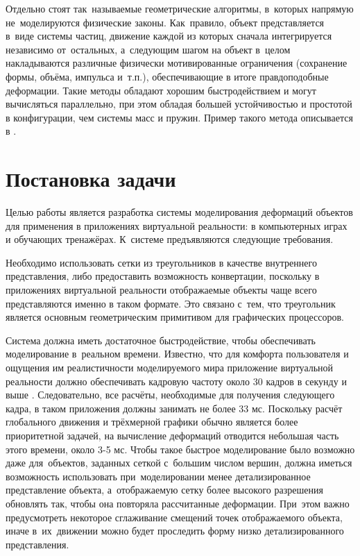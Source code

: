 \documentclass[a4paper, 14pt, titlepage]{extarticle}
\let\oldsection\section
\renewcommand{\section}{\newpage\oldsection}
\begin{document}
    Отдельно стоят так~называемые геометрические алгоритмы, в~которых напрямую не~моделируются
    физические законы. Как~правило, объект представляется в~виде системы частиц, движение каждой из
    которых сначала интегрируется независимо от~остальных, а~следующим шагом на объект в~целом
    накладываются различные физически мотивированные ограничения (сохранение формы, объёма, импульса
    и~т.п.), обеспечивающие в итоге правдоподобные деформации. Такие методы обладают хорошим
    быстродействием и могут вычисляться параллельно, при этом обладая большей устойчивостью и
    простотой в конфигурации, чем системы масс и пружин. Пример такого метода описывается в \cite{mueller-meshless}.

  \section{Постановка задачи}\label{sec:task}

    Целью работы является разработка системы моделирования деформаций объектов для применения в
    приложениях виртуальной реальности: в компьютерных играх и обучающих тренажёрах.
    К~системе предъявляются следующие требования.

    Необходимо использовать сетки из треугольников в качестве внутреннего представления, либо
    предоставить возможность конвертации, поскольку в приложениях виртуальной реальности отображаемые объекты
    чаще всего представляются именно в таком формате. Это связано с~тем, что треугольник является
    основным геометрическим примитивом для графических процессоров. %

    Система должна иметь достаточное быстродействие, чтобы обеспечивать моделирование в~реальном
    времени. Известно, что для комфорта пользователя и ощущения им реалистичности моделируемого мира
    приложение виртуальной реальности должно обеспечивать кадровую частоту около 30 кадров в секунду
    и выше \cite{claypool-framerate}. Следовательно, все расчёты, необходимые для получения
    следующего кадра, в таком приложения должны занимать не более 33 мс. Поскольку расчёт глобального
    движения и трёхмерной графики обычно является более приоритетной задачей, на вычисление
    деформаций отводится небольшая часть этого времени, около 3-5 мс. Чтобы такое быстрое
    моделирование было возможно даже для~объектов, заданных сеткой с~большим числом вершин,
    должна иметься возможность использовать при~моделировании менее детализированное представление
    объекта, а~отображаемую сетку более высокого разрешения обновлять так, чтобы она повторяла
    рассчитанные деформации. При~этом важно предусмотреть некоторое сглаживание смещений точек
    отображаемого объекта, иначе в~их~движении можно будет проследить форму низко детализированного
    представления.
\end{document}
